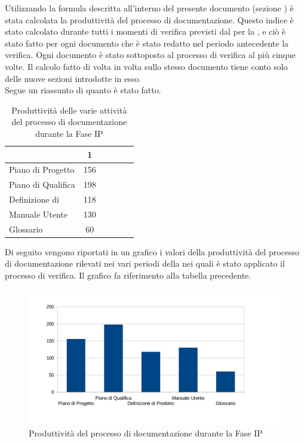 	Utilizzando la formula descritta all'interno del presente documento (sezione ) è stata calcolata la produttività del processo di documentazione. Questo indice è stato calcolato durante tutti i momenti di verifica previsti dal  per la , e ciò è stato fatto per ogni documento che è stato redatto nel periodo antecedente la verifica. Ogni documento è stato sottoposto al processo di verifica al più cinque volte. Il calcolo fatto di volta in volta sullo stesso documento tiene conto solo delle nuove sezioni introdotte in esso.\\
	Segue un riassunto di quanto è stato fatto.
	\begin{table}[H]
		  \centering
			\begin{tabu}{| l | c | c | c | c | c |}
			\hline
			&1		\\ \hline
			Piano di Progetto	& 156 \\ \hline
			Piano di Qualifica	& 198\\ \hline
			Definizione di  & 118 \\ \hline
			Manuale Utente & 130	 \\ \hline
			Glossario & 60 \\ \hline
			\end{tabu}
			\caption{Produttività delle varie attività del processo di documentazione durante la Fase IP}
	\end{table}
	Di seguito vengono riportati in un grafico i valori della produttività del processo di documentazione rilevati nei vari periodi della  nei quali è stato applicato il processo di verifica. Il grafico fa riferimento alla tabella precedente.\\
	\begin{figure}[H]
		\centering
			\includegraphics[width=12cm]{PianoDiQualifica/Pics/ProduttivitaDocumentazioneFaseIP.pdf}
		\caption{Produttività del processo di documentazione durante la Fase IP}
	\end{figure}

